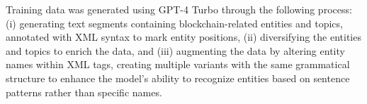 \documentclass[runningheads]{llncs}
\begin{document}

Training data was generated using GPT-4 Turbo through the following process: (i) generating text segments containing blockchain-related entities and topics, annotated with XML syntax to mark entity positions, (ii) diversifying the entities and topics to enrich the data, and (iii) augmenting the data by altering entity names within XML tags, creating multiple variants with the same grammatical structure to enhance the model's ability to recognize entities based on sentence patterns rather than specific names.

\end{document}
